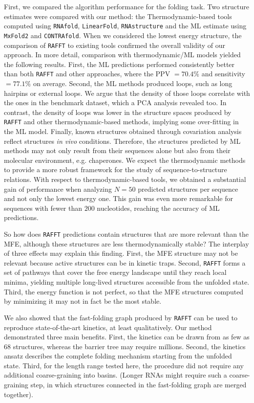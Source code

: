 First, we compared the algorithm performance for the folding task. Two structure estimates were compared with our method: the Thermodynamic-based tools computed using \texttt{RNAfold}, \texttt{LinearFold}, \texttt{RNAstructure} and the ML estimate using \texttt{MxFold2} and \texttt{CONTRAfold}. When we considered the lowest energy structure, the comparison of \texttt{RAFFT} to existing tools confirmed the overall validity of our approach. In more detail, comparison with thermodynamic/ML models yielded the following results. First, the ML predictions performed consistently better than both \texttt{RAFFT} and other approaches, where the PPV $=70.4\%$ and sensitivity $=77.1\%$ on average. Second, the ML methods produced loops, such as long hairpins or external loops. We argue that the density of those loops correlate with the ones in the benchmark dataset, which a PCA analysis revealed too. In contrast, the density of loops was lower in the structure spaces produced by \texttt{RAFFT} and other thermodynamic-based methods, implying some over-fitting in the ML model. Finally, known structures obtained through covariation analysis reflect structures \textit{in vivo} conditions. Therefore, the structures predicted by ML methods may not only result from their sequences alone but also from their molecular environment, e.g. chaperones. We expect the thermodynamic methods to provide a more robust framework for the study of sequence-to-structure relations.
With respect to thermodynamic-based tools, we obtained a substantial gain of performance when analyzing \(N=50\) predicted structures per sequence and not only the lowest energy one. This gain was even more remarkable for sequences with fewer than $200$ nucleotides, reaching the accuracy of ML predictions. 

So how does \texttt{RAFFT} predictions contain structures that are more relevant than the MFE, although these structures are less thermodynamically stable? The interplay of three effects may explain this finding. First, the MFE structure may not be relevant because active structures can be in kinetic traps. Second, \texttt{RAFFT} forms a set of pathways that cover the free energy landscape until they reach local minima, yielding multiple long-lived structures accessible from the unfolded state. Third, the energy function is not perfect, so that the MFE structures computed by minimizing it may not in fact be the most stable. 

We also showed that the fast-folding graph produced by \texttt{RAFFT} can be used to reproduce state-of-the-art kinetics, at least qualitatively. Our method demonstrated three main benefits. First, the kinetics can be drawn from as few as $68$ structures, whereas the barrier tree may require millions. Second, the kinetics ansatz describes the complete folding mechanism starting from the unfolded state. Third, for the length range tested here, the procedure did not require any additional coarse-graining into basins. (Longer RNAs might require such a coarse-graining step, in which structures connected in the fast-folding graph are merged together).

